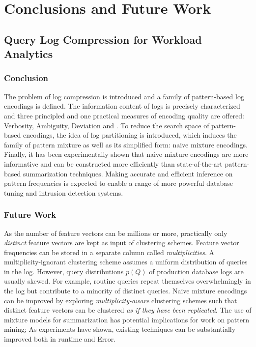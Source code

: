 \chapter{Conclusions and Future Work}\label{chap:conclusionsandfuturework}

\section{Query Log Compression for Workload Analytics}
\subsection{Conclusion}
The problem of log compression is introduced and a family of pattern-based log encodings is defined. 
The information content of logs is precisely characterized and three principled and one practical measures of encoding quality are offered: Verbosity, Ambiguity, Deviation and \errorname. 
To reduce the search space of pattern-based encodings, the idea of log partitioning is introduced, which induces the family of pattern mixture as well as its simplified form: naive mixture encodings. 
Finally, it has been experimentally shown that naive mixture encodings are more informative and can be constructed more efficiently than state-of-the-art pattern-based summarization techniques. 
Making accurate and efficient inference on pattern frequencies is expected to enable a range of more powerful database tuning and intrusion detection systems.

\subsection{Future Work}
As the number of feature vectors can be millions or more, practically only \textit{distinct} feature vectors are kept as input of clustering schemes.
Feature vector frequencies can be stored in a separate column called \textit{multiplicities}.
A multiplicity-ignorant clustering scheme assumes a uniform distribution of queries in the log.
However, query distributions $p(Q)$ of production database logs are usually skewed.
For example, routine queries repeat themselves overwhelmingly in the log but contribute to a minority of distinct queries.
Naive mixture encodings can be improved by exploring \textit{multiplicity-aware} clustering schemes such that distinct feature vectors can be clustered \textit{as if they have been replicated}.
The use of mixture models for summarization has potential implications for work on pattern mining; As experiments have shown, existing techniques can be substantially improved both in runtime and Error.

